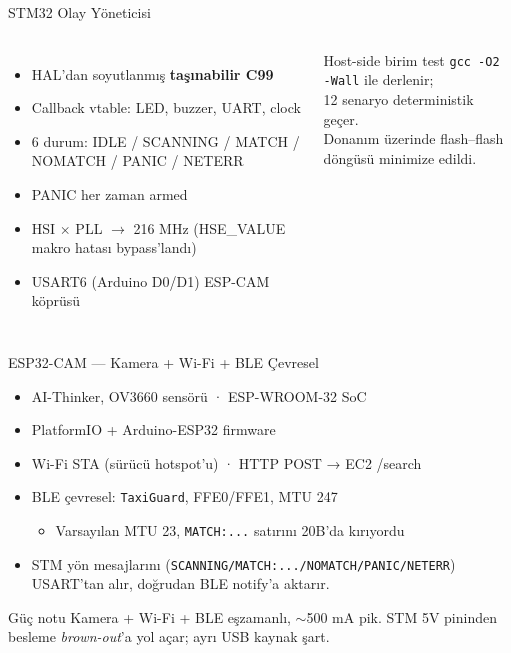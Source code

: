 \documentclass[aspectratio=169,12pt]{beamer}
\begin{document}
\begin{frame}{STM32 Olay Yöneticisi}
    \begin{columns}
        \begin{itemize}
            \item HAL'dan soyutlanmış \textbf{taşınabilir C99}
            \item Callback vtable: LED, buzzer, UART, clock
            \item 6 durum: IDLE / SCANNING / MATCH / NOMATCH / PANIC / NETERR
            \item PANIC her zaman armed
            \item \alert{HSI $\times$ PLL $\rightarrow$ 216 MHz}
                  (HSE\_VALUE makro hatası bypass'landı)
            \item USART6 (Arduino D0/D1) ESP-CAM köprüsü
        \end{itemize}
        \begin{exampleblock}{Host-side birim test}
            \texttt{gcc -O2 -Wall} ile derlenir; \\
            12 senaryo deterministik geçer.\\[2pt]
            Donanım üzerinde flash--flash döngüsü minimize edildi.
        \end{exampleblock}
    \end{columns}
\end{frame}

\begin{frame}{ESP32-CAM --- Kamera + Wi-Fi + BLE Çevresel}
    \begin{itemize}
        \item AI-Thinker, OV3660 sensörü · ESP-WROOM-32 SoC
        \item PlatformIO + Arduino-ESP32 firmware
        \item Wi-Fi STA (sürücü hotspot'u) · HTTP POST → EC2 /search
        \item BLE çevresel: \texttt{TaxiGuard}, FFE0/FFE1, MTU 247
            \begin{itemize}
                \item Varsayılan MTU 23, \texttt{MATCH:...} satırını 20B'da kırıyordu
            \end{itemize}
        \item STM yön mesajlarını (\texttt{SCANNING/MATCH:.../NOMATCH/PANIC/NETERR})
              USART'tan alır, doğrudan BLE notify'a aktarır.
    \end{itemize}

    \vspace{0.3cm}
    \begin{alertblock}{Güç notu}
        Kamera + Wi-Fi + BLE eşzamanlı, $\sim$500 mA pik. STM 5V pininden
        besleme \emph{brown-out}'a yol açar; ayrı USB kaynak şart.
    \end{alertblock}
\end{frame}
\end{document}
